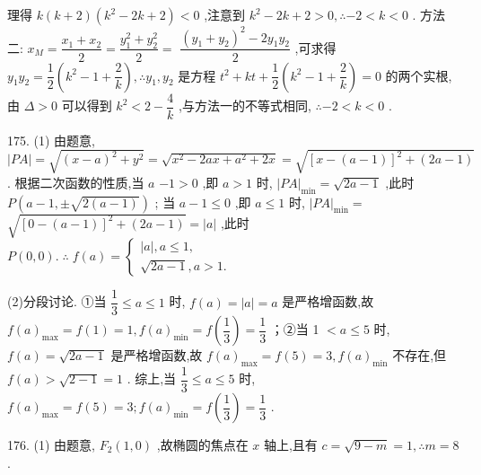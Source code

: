 理得 $k\left( {k + 2}\right) \left( {{k}^{2} - {2k} + 2}\right)  < 0$ ,注意到 ${k}^{2} - {2k} + 2 > 0,\therefore  - 2 < k < 0$ . 方法二: ${x}_{M} = \dfrac{{x}_{1} + {x}_{2}}{2} = \dfrac{{y}_{1}^{2} + {y}_{2}^{2}}{2} =$  $\dfrac{{\left( {y}_{1} + {y}_{2}\right) }^{2} - 2{y}_{1}{y}_{2}}{2}$ ,可求得 ${y}_{1}{y}_{2} = \dfrac{1}{2}\left( {{k}^{2} - 1 + \dfrac{2}{k}}\right) ,\therefore {y}_{1},{y}_{2}$ 是方程 ${t}^{2} + {kt} + \dfrac{1}{2}\left( {{k}^{2} - 1 + \dfrac{2}{k}}\right)  = 0$ 的两个实根,由 $\Delta  > 0$ 可以得到 ${k}^{2} < 2 - \dfrac{4}{k}$ ,与方法一的不等式相同, $\therefore  - 2 < k < 0$ .

175. (1) 由题意, $\left| {PA}\right|  = \sqrt{{\left( x - a\right) }^{2} + {y}^{2}} = \sqrt{{x}^{2} - {2ax} + {a}^{2} + {2x}} = \sqrt{{\left\lbrack  x - \left( a - 1\right) \right\rbrack  }^{2} + \left( {{2a} - 1}\right) }$ . 根据二次函数的性质,当 $a$  $- 1 > 0$ ,即 $a > 1$ 时, ${\left| PA\right| }_{\min } = \sqrt{{2a} - 1}$ ,此时 $P\left( {a - 1, \pm  \sqrt{2\left( {a - 1}\right) }}\right)$ ; 当 $a - 1 \leq  0$ ,即 $a \leq  1$ 时, ${\left| PA\right| }_{\min } =$  $\sqrt{{\left\lbrack  0 - \left( a - 1\right) \right\rbrack  }^{2} + \left( {{2a} - 1}\right) } = \left| a\right|$ ,此时 $P\left( {0,0}\right) .\;\therefore \;f\left( a\right)  = \left\{  \begin{array}{l} \left| a\right| ,a \leq  1, \\  \sqrt{{2a} - 1},a > 1. \end{array}\right.$

(2)分段讨论. ①当 $\dfrac{1}{3} \leq  a \leq  1$ 时, $f\left( a\right)  = \left| a\right|  = a$ 是严格增函数,故 $f{\left( a\right) }_{\max } = f\left( 1\right)  = 1,f{\left( a\right) }_{\min } = f\left( \dfrac{1}{3}\right)  = \dfrac{1}{3}$ ；②当 1 $< a \leq  5$ 时, $f\left( a\right)  = \sqrt{{2a} - 1}$ 是严格增函数,故 $f{\left( a\right) }_{\max } = f\left( 5\right)  = 3,f{\left( a\right) }_{\min }$ 不存在,但 $f\left( a\right)  > \sqrt{2 - 1} = 1$ . 综上,当 $\dfrac{1}{3} \leq  a \leq  5$ 时, $f{\left( a\right) }_{\max } = f\left( 5\right)  = 3;f{\left( a\right) }_{\min } = f\left( \dfrac{1}{3}\right)  = \dfrac{1}{3}$ .

176. (1) 由题意, ${F}_{2}\left( {1,0}\right)$ ,故椭圆的焦点在 $x$ 轴上,且有 $c = \sqrt{9 - m} = 1,\therefore m = 8$ .

